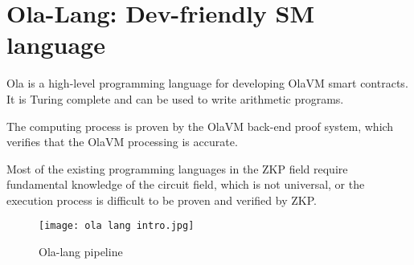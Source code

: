 \section{Ola-Lang: Dev-friendly SM language}\label{sec:Ola-Lang}

Ola is a high-level programming language for developing OlaVM smart contracts.
It is Turing complete and can be used to write arithmetic programs.

The computing process is proven by the OlaVM back-end proof system, which verifies that the OlaVM processing is accurate.

Most of the existing programming languages in the ZKP field require fundamental knowledge of the circuit field,
which is not universal, or the execution process is difficult to be proven and verified by ZKP.

\begin{figure}[!ht]
    \centering
    \texttt{[image: ola lang intro.jpg]}
    \caption{Ola-lang pipeline}
    \label{fig:ola lang intro}
\end{figure}




